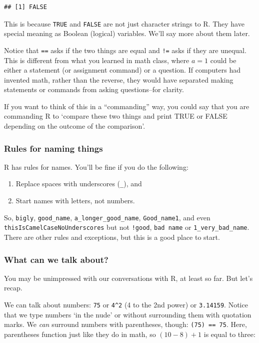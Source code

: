 \documentclass[]{article}
\providecommand{\tightlist}{%
  \setlength{\itemsep}{0pt}\setlength{\parskip}{0pt}}
\begin{document}
\begin{verbatim}
## [1] FALSE
\end{verbatim}

This is because \texttt{TRUE} and \texttt{FALSE} are not just character
strings to R. They have special meaning as Boolean (logical) variables.
We'll say more about them later.

Notice that \texttt{==} asks if the two things are equal and \texttt{!=}
asks if they are unequal. This is different from what you learned in
math class, where \(a=1\) could be either a statement (or assignment
command) or a question. If computers had invented math, rather than the
reverse, they would have separated making statements or commands from
asking questions--for clarity.

If you want to think of this in a ``commanding'' way, you could say that
you are commanding R to `compare these two things and print TRUE or
FALSE depending on the outcome of the comparison'.

\subsubsection{Rules for naming things}\label{rules-for-naming-things}

R has rules for names. You'll be fine if you do the following:

\begin{enumerate}
\def\labelenumi{\arabic{enumi}.}
\tightlist
\item
  Replace spaces with underscores (\texttt{\_}), and
\item
  Start names with letters, not numbers.
\end{enumerate}

So, \texttt{bigly}, \texttt{good\_name}, \texttt{a\_longer\_good\_name},
\texttt{Good\_name1}, and even \texttt{thisIsCamelCaseNoUnderscores} but
not \texttt{!good}, \texttt{bad\ name} or \texttt{1\_very\_bad\_name}.
There are other rules and exceptions, but this is a good place to start.

\subsubsection{What can we talk about?}\label{what-can-we-talk-about}

You may be unimpressed with our conversations with R, at least so far.
But let's recap.

We can talk about numbers: \texttt{75} or \texttt{4\^{}2} (4 to the 2nd
power) or \texttt{3.14159}. Notice that we type numbers `in the nude' or
without surrounding them with quotation marks. We \emph{can} surround
numbers with parentheses, though: \texttt{(75)\ ==\ 75}. Here,
parentheses function just like they do in math, so \((10-8)+1\) is equal
to three:
\end{document}
